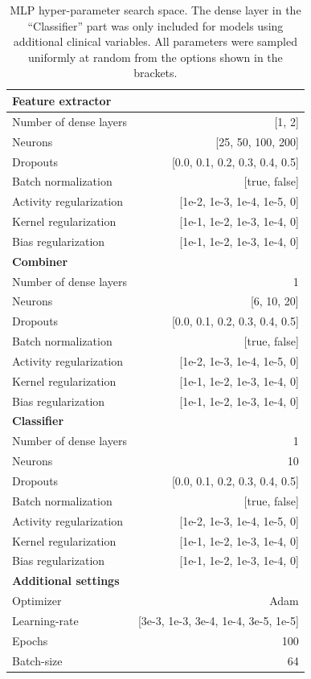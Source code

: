 \documentclass[preprint]{elsarticle}
\begin{document}
\renewcommand{\arraystretch}{1.2}
\begin{table}[H]
  \centering
  \scriptsize
\begin{adjustbox}{center}
\begin{tabular}{@{}lr@{}}
\toprule
\textbf{Feature extractor}  & \\
\midrule
{Number of dense layers}    & [1, 2] \\
{Neurons}                   & [25, 50, 100, 200] \\
{Dropouts}                  & [0.0, 0.1, 0.2, 0.3, 0.4, 0.5] \\
{Batch normalization}       & [true, false] \\
{Activity regularization}   & [1e-2, 1e-3, 1e-4, 1e-5, 0] \\
{Kernel regularization}     & [1e-1, 1e-2, 1e-3, 1e-4, 0] \\
{Bias regularization}       & [1e-1, 1e-2, 1e-3, 1e-4, 0] \\
\midrule
\textbf{Combiner}           & \\
\midrule
{Number of dense layers}    & 1 \\
{Neurons}                   & [6, 10, 20] \\
{Dropouts}                  & [0.0, 0.1, 0.2, 0.3, 0.4, 0.5] \\
{Batch normalization}       & [true, false] \\
{Activity regularization}   & [1e-2, 1e-3, 1e-4, 1e-5, 0] \\
{Kernel regularization}     & [1e-1, 1e-2, 1e-3, 1e-4, 0] \\
{Bias regularization}       & [1e-1, 1e-2, 1e-3, 1e-4, 0] \\
\midrule
\textbf{Classifier}         & \\
\midrule
{Number of dense layers}    & 1 \\
{Neurons}                   & 10 \\
{Dropouts}                  & [0.0, 0.1, 0.2, 0.3, 0.4, 0.5] \\
{Batch normalization}       & [true, false] \\
{Activity regularization}   & [1e-2, 1e-3, 1e-4, 1e-5, 0] \\
{Kernel regularization}     & [1e-1, 1e-2, 1e-3, 1e-4, 0] \\
{Bias regularization}       & [1e-1, 1e-2, 1e-3, 1e-4, 0] \\
\midrule
\textbf{Additional settings} & \\
\midrule
Optimizer                   & Adam \\
Learning-rate               & [3e-3, 1e-3, 3e-4, 1e-4, 3e-5, 1e-5] \\
Epochs                      & 100 \\
Batch-size                  & 64 \\

\bottomrule
\end{tabular}
\end{adjustbox}
\caption{MLP hyper-parameter search space. The dense layer in the ``Classifier'' part was only included for models using additional clinical variables. All parameters were sampled uniformly at random from the options shown in the brackets.}
\label{table:mlp}
\end{table}
\end{document}
